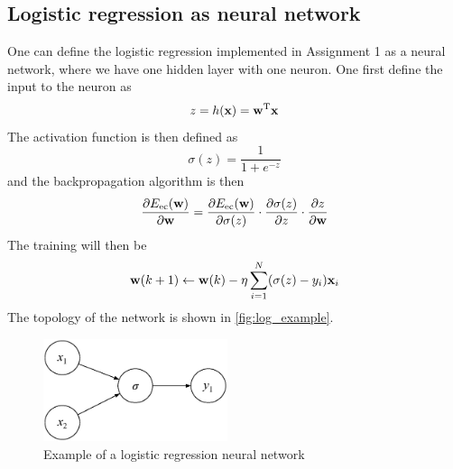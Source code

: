 \documentclass[../main.tex]{subfiles}
\begin{document}
\subsection{Logistic regression as neural network}

One can define the logistic regression implemented in Assignment 1 \cite{assignment1} as a neural network, where we have one hidden layer with one neuron. One first define the input to the neuron as
\begin{equation}
	z = h(\mathbf{x}) =\mathbf{w}^{\rm T} \mathbf{x}
\end{equation}
The activation function is then defined as
\begin{equation}
	\sigma(z)=\frac{1}{1+e^{-z}}
\end{equation}
and the backpropagation algorithm is then
\begin{equation}
	\frac{\partial E_{\rm ec}(\mathbf{w})}{\partial \mathbf{w}} = 
		\frac{\partial E_{\rm ec}(\mathbf{w})}{\partial \sigma(z)}
		\cdot \frac{\partial \sigma(z)}{\partial z}
		\cdot \frac{\partial z}{\partial \mathbf{w}}
\end{equation}
The training will then be
\begin{equation}
	\mathbf{w}(k+1) \leftarrow \mathbf{w}(k) - \eta \sum_{i=1}^{N}(\sigma(z)-y_i)\mathbf{x}_i
\end{equation}
The topology of the network is shown in \autoref{fig:log_example}.

\begin{figure}
	\centering
    \includegraphics[height=3cm]{figures/theory/log_network}
    \caption{Example of a logistic regression neural network}
    \label{fig:log_example}
\end{figure}
\end{document}
